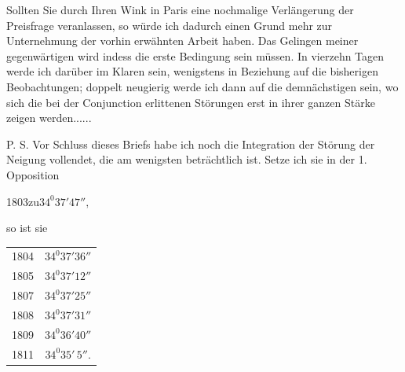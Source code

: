 \par
\noindent\hspace*{\parindent}Sollten Sie durch Ihren Wink in Paris eine nochmalige Verlängerung der Preisfrage veranlassen, so würde ich dadurch einen Grund mehr zur Unternehmung der vorhin erwähnten Arbeit haben. Das Gelingen meiner gegenwärtigen wird indess die erste Bedingung sein müssen. In vierzehn Tagen werde ich darüber im Klaren sein, wenigstens in Beziehung auf die bisherigen Beobachtungen; doppelt neugierig werde ich dann auf die demnächstigen sein, wo sich die bei der Conjunction erlittenen Störungen erst in ihrer ganzen Stärke zeigen werden.\quad.\quad.\quad.\quad.\quad.
\par
\noindent\hspace*{\parindent}P. S. Vor Schluss dieses Briefs habe ich noch die Integration der Störung der Neigung vollendet, die am wenigsten beträchtlich ist. Setze ich sie in der 1. Opposition
\begin{center}1803\quad zu\quad \(34^{0}37'47'',\)\end{center}
so ist sie
\begin{center}
\begin{tabular}{lc}
1804 & \(34^{0}37'36''\)\\
1805 & \(34^{0}37'12''\)\\
1807 & \(34^{0}37'25''\)\\
1808 & \(34^{0}37'31''\)\\
1809 & \(34^{0}36'40''\)\\
1811 & \(34^{0}35'\,5''.\)\\
\end{tabular}
\end{center}
\par
